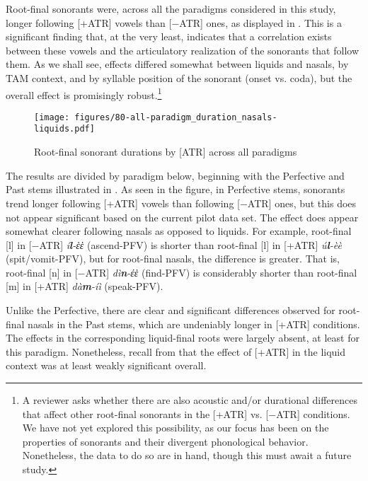 \documentclass[output=paper,colorlinks,citecolor=brown]{langscibook}
\begin{document}
Root-final sonorants were, across all the paradigms considered in this study, longer following [+ATR] vowels than [−ATR] ones, as displayed in . This is a significant finding that, at the very least, indicates that a correlation exists between these vowels and the articulatory realization of the sonorants that follow them. As we shall see, effects differed somewhat between liquids and  nasals, by TAM context, and by syllable position of the sonorant (onset vs. coda), but the overall effect is promisingly robust.\footnote{A reviewer asks whether there are also acoustic and/or durational differences that affect other root-final sonorants in the [+ATR] vs. [−ATR] conditions. We have not yet explored this possibility, as our focus has been on the properties of sonorants and their divergent phonological behavior. Nonetheless, the data to do so are in hand, though this must await a future study.}

\begin{figure}
    \centering
    \texttt{[image: figures/80-all-paradigm\_duration\_nasals-liquids.pdf]}  
    \caption{Root-final sonorant durations by [ATR] across all paradigms}
    \label{fig:conson-dur-all}
\end{figure}

The results are divided by paradigm below, beginning with the Perfective and Past stems illustrated in . As seen in the figure, in Perfective stems, sonorants trend longer following [+ATR] vowels than following [−ATR] ones, but this does not appear significant based on the current pilot data set. The effect does appear somewhat clearer following nasals as opposed to liquids. For example, root-final [l] in [−ATR] \textit{í\textbf{l}-ὲὲ} (ascend-\textsc{PFV}) is shorter than root-final [l] in [+ATR]  \textit{ú\textbf{l}-èè }(spit/vomit-\textsc{PFV}), but for root-final nasals, the difference is greater. That is, root-final [n] in [−ATR] \textit{dì\textbf{n}-έὲ} (find-\textsc{PFV}) is considerably shorter than root-final [m] in [+ATR] \textit{dà\textbf{m}-íì} (speak-\textsc{PFV}).

Unlike the Perfective, there are clear and significant differences observed for root-final nasals in the Past stems, which are undeniably longer in [+ATR] conditions. The effects in the corresponding liquid-final roots were largely absent, at least for this paradigm. Nonetheless, recall from  that the effect of [+ATR] in the liquid context was at least weakly significant overall.
\end{document}
